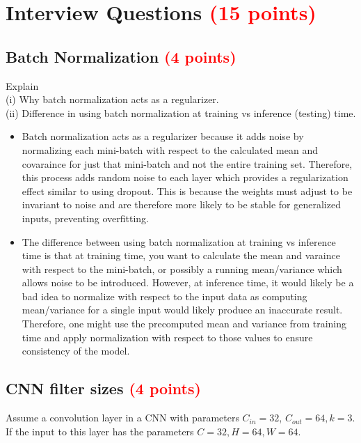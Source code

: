 \documentclass[answers]{exam}
\newcommand{\mypoints}[1]{\textcolor{red}{(#1 points)}}
\begin{document}
\section{Interview Questions \mypoints{15}}

\subsection{Batch Normalization \mypoints{4}}
Explain \\ 
(i) Why batch normalization acts as a regularizer. \\ 
(ii) Difference in using batch normalization at training vs inference (testing) time. 
\begin{solution}
    \begin{itemize}
        \item Batch normalization acts as a regularizer because it adds noise by normalizing each mini-batch with respect to the calculated mean and covaraince for just that mini-batch and not the entire
        training set. Therefore, this process adds random noise to each layer which provides a regularization effect similar to using dropout. This is because the weights must adjust to be invariant to noise and are therefore more likely to be stable for generalized inputs, preventing overfitting.
        \item The difference between using batch normalization at training vs inference time is that at training time, you want to calculate the mean and varaince with respect to the mini-batch, or possibly a running mean/variance which allows noise to be introduced. However, at inference time, it would likely be a bad idea to normalize with respect to the input data as computing mean/variance for a single input would likely produce an inaccurate result. Therefore, one might use the precomputed mean and variance from training time and apply normalization with respect to those values to ensure consistency of the model.
    \end{itemize}
\end{solution}

\subsection{CNN filter sizes \mypoints{4}}
Assume a convolution layer in a CNN with parameters $C_{in} = 32$, $C_{out} = 64, k = 3$. If the input to this layer has the parameters $C = 32, H = 64, W = 64$. 
\end{document}
